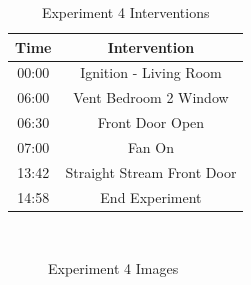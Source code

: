 \documentclass{article}
\begin{document}
\begin{table}[H]
	\centering
	\caption{Experiment 4 Interventions}
	\begin{tabular}{|c|c|} 
		\hline
		Time & Intervention \\ \hline \hline
		00:00 & Ignition - Living Room \\ \hline
		06:00 & Vent Bedroom 2 Window \\ \hline
		06:30 & Front Door Open \\ \hline
		07:00 & Fan On \\ \hline
		13:42 & Straight Stream Front Door \\ \hline
		14:58 & End Experiment \\ \hline
	\end{tabular}
	\label{Table:Exp4Interventions}
\end{table}

\begin{figure}[H]
	\setcounter{subfigure}{0} 
	\centering 
	 \ 
	 \ 
	 \ 
	\caption{Experiment 4 Images}
	\label{fig:Experiment4ImagesCont1} 
\end{figure}
\end{document}
